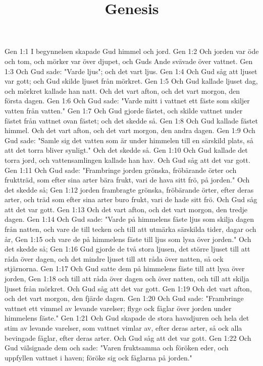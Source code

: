 

\title{Genesis}

Gen 1:1  I begynnelsen skapade Gud himmel och jord.
Gen 1:2  Och jorden var öde och tom, och mörker var över djupet, och Guds Ande svävade över vattnet.
Gen 1:3  Och Gud sade: "Varde ljus"; och det vart ljus.
Gen 1:4  Och Gud såg att ljuset var gott; och Gud skilde ljuset från mörkret.
Gen 1:5  Och Gud kallade ljuset dag, och mörkret kallade han natt. Och det vart afton, och det vart morgon, den första dagen.
Gen 1:6  Och Gud sade: "Varde mitt i vattnet ett fäste som skiljer vatten från vatten."
Gen 1:7  Och Gud gjorde fästet, och skilde vattnet under fästet från vattnet ovan fästet; och det skedde så.
Gen 1:8  Och Gud kallade fästet himmel. Och det vart afton, och det vart morgon, den andra dagen.
Gen 1:9  Och Gud sade: "Samle sig det vatten som är under himmelen till en särskild plats, så att det torra bliver synligt." Och det skedde så.
Gen 1:10  Och Gud kallade det torra jord, och vattensamlingen kallade han hav. Och Gud såg att det var gott.
Gen 1:11  Och Gud sade: "Frambringe jorden grönska, fröbärande örter och fruktträd, som efter sina arter bära frukt, vari de hava sitt frö, på jorden." Och det skedde så;
Gen 1:12  jorden frambragte grönska, fröbärande örter, efter deras arter, och träd som efter sina arter buro frukt, vari de hade sitt frö. Och Gud såg att det var gott.
Gen 1:13  Och det vart afton, och det vart morgon, den tredje dagen.
Gen 1:14  Och Gud sade: "Varde på himmelens fäste ljus som skilja dagen från natten, och vare de till tecken och till att utmärka särskilda tider, dagar och år,
Gen 1:15  och vare de på himmelens fäste till ljus som lysa över jorden." Och det skedde så;
Gen 1:16  Gud gjorde de två stora ljusen, det större ljuset till att råda över dagen, och det mindre ljuset till att råda över natten, så ock stjärnorna.
Gen 1:17  Och Gud satte dem på himmelens fäste till att lysa över jorden,
Gen 1:18  och till att råda över dagen och över natten, och till att skilja ljuset från mörkret. Och Gud såg att det var gott.
Gen 1:19  Och det vart afton, och det vart morgon, den fjärde dagen.
Gen 1:20  Och Gud sade: "Frambringe vattnet ett vimmel av levande varelser; flyge ock fåglar över jorden under himmelens fäste."
Gen 1:21  Och Gud skapade de stora havsdjuren och hela det stim av levande varelser, som vattnet vimlar av, efter deras arter, så ock alla bevingade fåglar, efter deras arter. Och Gud såg att det var gott.
Gen 1:22  Och Gud välsignade dem och sade: "Varen fruktsamma och föröken eder, och uppfyllen vattnet i haven; föröke sig ock fåglarna på jorden."
